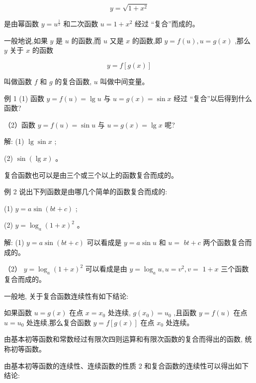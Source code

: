 \documentclass[lang=cn,newtx,12pt,scheme=chinese]{elegantbook}
\begin{document}
\[
y = \sqrt{1 + {x}^{2}}
\]

是由幂函数 \(y = {u}^{\frac{1}{2}}\) 和二次函数 \(u = 1 + {x}^{2}\) 经过 “复合”而成的。

\begin{definition}[复合函数] 

一般地说,如果 \(y\) 是 \(u\) 的函数,而 \(u\) 又是 \(x\) 的函数,即 \(y = f\left( u\right) ,u = g\left( x\right)\) ,那么 \(y\) 关于 \(x\) 的函数

\[
y = f\left\lbrack {g\left( x\right) }\right\rbrack
\]

叫做函数 \(f\) 和 \(g\) 的复合函数, \(u\) 叫做中间变量。

\end{definition}

例 1 (1) 函数 \(y = f\left( u\right) = \lg u\) 与 \(u = g\left( x\right) = \sin x\) 经过 “复合”以后得到什么函数?

（2）函数 \(y = f\left( u\right) = \sin u\) 与 \(u = g\left( x\right) = \lg x\) 呢?

解: (1) \(\lg \sin x\) ;

(2) \(\sin \left( {\lg x}\right)\) 。

复合函数也可以是由三个或三个以上的函数复合而成的。

例 2 说出下列函数是由哪几个简单的函数复合而成的:

(1) \(y = a\sin \left( {{bt} + c}\right)\) ;

(2) \(y = {\log }_{a}{\left( 1 + x\right) }^{2}\) 。

解: (1) \(y = a\sin \left( {{bt} + c}\right)\) 可以看成是 \(y = a\sin u\) 和 \(u =\) \({bt} + c\) 两个函数复合而成的。

（2） \(y = {\log }_{a}{\left( 1 + x\right) }^{2}\) 可以看成是由 \(y = {\log }_{a}u,u = {v}^{2},v =\) \(1 + x\) 三个函数复合而成的。

一般地, 关于复合函数连续性有如下结论:

\begin{definition}[复合函数连续性] 
如果函数 \(u = g\left( x\right)\) 在点 \(x = {x}_{0}\) 处连续, \(g\left( {x}_{0}\right) = {u}_{0}\) ,且函数 \(y = f\left( u\right)\) 在点 \(u = {u}_{0}\) 处连续,那么复合函数 \(y = f\left\lbrack {g\left( x\right) }\right\rbrack\) 在点 \({x}_{0}\) 处连续。
\end{definition}

由基本初等函数和常数经过有限次四则运算和有限次函数的复合而得出的函数, 统称初等函数。

由基本初等函数的连续性、连续函数的性质 2 和复合函数的连续性可以得出如下结论:
\end{document}
